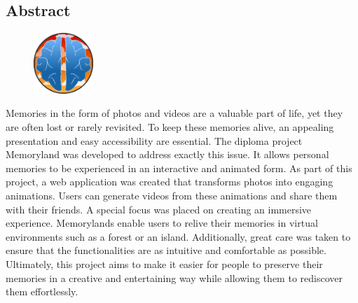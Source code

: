 \begin{spacing}{1}
    \chapter*{Abstract}
\end{spacing}
\begin{figure}
    \begin{center}
      \includegraphics[width=0.2\textwidth]{pics/memoryland-logo.png}
    \end{center}
\end{figure}

Memories in the form of photos and videos are a valuable part of life, yet they are often 
lost or rarely revisited. To keep these memories alive, an appealing presentation and easy 
accessibility are essential.
\newline
The diploma project Memoryland was developed to address exactly this issue. It allows 
personal memories to be experienced in an interactive and animated form. As part of 
this project, a web application was created that transforms photos into engaging 
animations. Users can generate videos from these animations and share them with their friends.
\newline
A special focus was placed on creating an immersive experience. Memorylands enable 
users to relive their memories in virtual environments such as a forest or an island. 
Additionally, great care was taken to ensure that the functionalities are as intuitive
and comfortable as possible.
\newline
Ultimately, this project aims to make it easier for people to preserve their memories 
in a creative and entertaining way while allowing them to rediscover them effortlessly.

